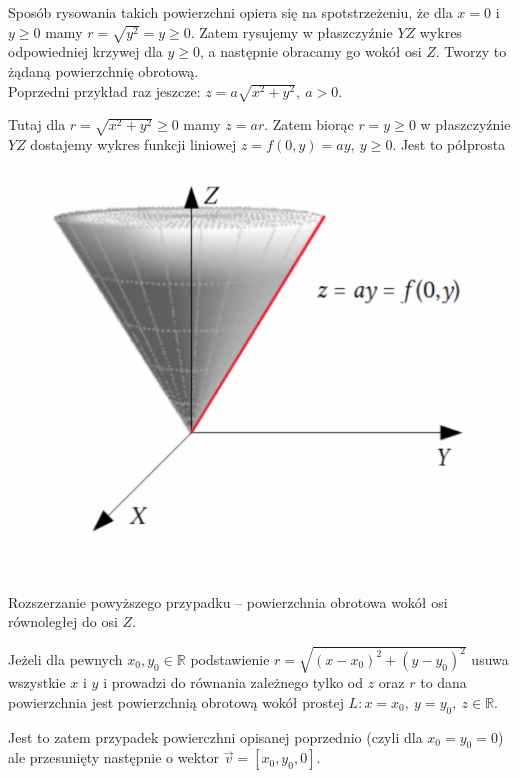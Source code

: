 Sposób rysowania takich powierzchni opiera się na spotstrzeżeniu, że dla $x = 0$ i $y \geq 0$ mamy $ r = \sqrt{y^2} = y \geq 0 $.
Zatem rysujemy w płaszczyźnie $YZ$ wykres odpowiedniej krzywej dla $y \geq 0$, a następnie obracamy go wokół osi $Z$. Tworzy to
żądaną powierzchnię obrotową. \\

Poprzedni przykład raz jeszcze: $ z = a\sqrt{x^2 + y^2}, \ a > 0 $.

Tutaj dla $ r = \sqrt{x^2 + y^2} \geq 0 $ mamy $z =ar$. Zatem biorąc $ r = y \geq 0 $ w płaszczyźnie $YZ$ dostajemy wykres
funkcji liniowej $ z = f(0, y) = ay, \ y \geq 0 $. Jest to półprosta

\begin{center}
\includegraphics[scale=0.6]{img/stozek_wlzm_3.png}
\end{center}

Rozszerzanie powyższego przypadku -- powierzchnia obrotowa wokół osi równoległej do osi $Z$.

Jeżeli dla pewnych $x_0, y_0 \in \mathbb{R}$ podstawienie $ r = \sqrt{(x - x_0)^2 + (y - y_0)^2} $ usuwa wszystkie $x$ i $y$ i prowadzi
do równania zależnego tylko od $z$ oraz $r$ to dana powierzchnia jest powierzchnią obrotową wokół prostej
$ L : x = x_0, \ y = y_0, \ z\in \mathbb{R} $.

Jest to zatem przypadek powierczhni opisanej poprzednio (czyli dla $x_0 = y_0 = 0$) ale przesunięty następnie o wektor $ \vec{v} = [x_0, y_0, 0] $. \\

